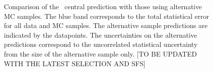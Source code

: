 \begin{figure}[hbt]
\begin{center}
	\caption{
	  \label{fig:ttllsyst}\protect 
          Comparison of the \ttll\ central prediction with those using
          alternative MC samples. The blue band corresponds to the
          total statistical error for all data and MC samples. The
          alternative sample predictions are indicated by the
          datapoints. The uncertainties on the alternative predictions
          correspond to the uncorrelated statistical uncertainty from
          the size of the alternative sample only.
        [TO BE UPDATED WITH THE LATEST SELECTION AND SFS]}
      \end{center}
    \end{figure}

\clearpage

%
%
%
%
%
